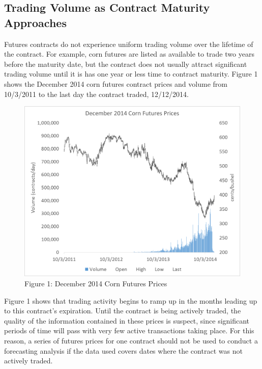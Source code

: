 \documentclass[
  letterpaper,
  DIV=11,
  numbers=noendperiod]{scrreprt}
\begin{document}
\hypertarget{trading-volume-as-contract-maturity-approaches}{%
\subsection{Trading Volume as Contract Maturity
Approaches}\label{trading-volume-as-contract-maturity-approaches}}

Futures contracts do not experience uniform trading volume over the
lifetime of the contract. For example, corn futures are listed as
available to trade two years before the maturity date, but the contract
does not usually attract significant trading volume until it is has one
year or less time to contract maturity. Figure 1 shows the December 2014
corn futures contract prices and volume from 10/3/2011 to the last day
the contract traded, 12/12/2014.

\begin{figure}

{\centering \includegraphics{Excel-files/IntroductiontoCommodityTS-Nearby_construct_files/image005.png}

}

\caption{Figure 1: December 2014 Corn Futures Prices}

\end{figure}

Figure 1 shows that trading activity begins to ramp up in the months
leading up to this contract's expiration. Until the contract is being
actively traded, the quality of the information contained in these
prices is suspect, since significant periods of time will pass with very
few active transactions taking place. For this reason, a series of
futures prices for one contract should not be used to conduct a
forecasting analysis if the data used covers dates where the contract
was not actively traded.
\end{document}
